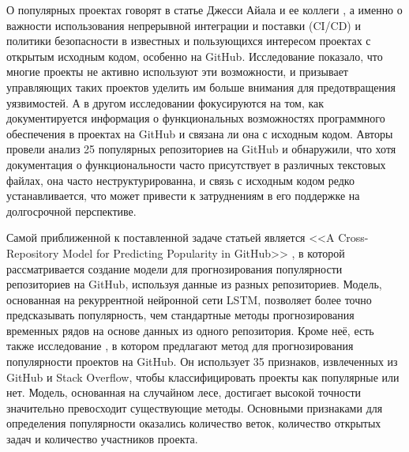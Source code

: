 О популярных проектах говорят в статье Джесси Айала и ее коллеги \cite{AyalaG23}, а именно о важности использования непрерывной интеграции и поставки (CI/CD) и политики безопасности в известных и пользующихся интересом проектах с открытым исходным кодом, особенно на GitHub. Исследование показало, что многие проекты не активно используют эти возможности, и призывает управляющих таких проектов уделить им больше внимания для предотвращения уязвимостей. А в другом исследовании \cite{PuhlfurssMM22} фокусируются на том, как документируется информация о функциональных возможностях программного обеспечения в проектах на GitHub и связана ли она с исходным кодом. Авторы провели анализ 25 популярных репозиториев на GitHub и обнаружили, что хотя документация о функциональности часто присутствует в различных текстовых файлах, она часто неструктурированна, и связь с исходным кодом редко устанавливается, что может привести к затруднениям в его поддержке на долгосрочной перспективе. 

Самой приближенной к поставленной задаче статьей является <<A Cross-Repository Model for Predicting Popularity in GitHub>> \cite{abs-1902-05216}, в которой рассматривается создание модели для прогнозирования популярности репозиториев на GitHub, используя данные из разных репозиториев. Модель, основанная на рекуррентной нейронной сети LSTM, позволяет более точно предсказывать популярность, чем стандартные методы прогнозирования временных рядов на основе данных из одного репозитория. Кроме неё, есть также исследование \cite{HanDXWY19}, в котором предлагают метод для прогнозирования популярности проектов на GitHub. Он использует 35 признаков, извлеченных из GitHub и Stack Overflow, чтобы классифицировать проекты как популярные или нет. Модель, основанная на случайном лесе, достигает высокой точности значительно превосходит существующие методы. Основными признаками для определения популярности оказались количество веток, количество открытых задач и количество участников проекта.